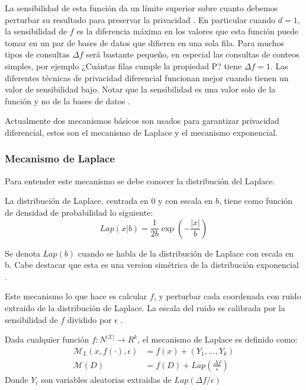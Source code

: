 La sensibilidad de esta función da un límite superior sobre cuanto debemos perturbar su resultado para preservar la privacidad \cite{dwork2014algorithmic}. En particular cuando $d = 1$, la sensibilidad de $f$ es la diferencia máxima en los valores que esta función puede tomar en un par de bases de datos que difieren en una sola fila. Para muchos tipos de consultas $\Delta f$ será bastante pequeño, en especial las consultas de conteos simples, por ejemplo ¿Cuántas filas cumple la propiedad P? tiene $\Delta f = 1$. Las diferentes técnicas de privacidad diferencial funcionan mejor cuando tienen un valor de sensibilidad bajo. Notar que la sensibilidad es una valor solo de la función y no de la bases de datos \cite{dwork2008differential}.

Actualmente dos mecanismos básicos son usados para garantizar privacidad diferencial, estos son el mecanismo de Laplace y el mecanismo exponencial.

\subsubsection{Mecanismo de Laplace}

Para entender este mecanismo se debe conocer la distribución del Laplace.

\begin{definicion}
  La distribución de Laplace, centrada en 0 y con escala en $b$, tiene como función de densidad de probabilidad lo siguiente:
  \begin{equation}
    Lap(x|b) = \frac{1}{2b} \exp\left(- \frac{|x|}{b}\right)
  \end{equation}
\end{definicion}

Se denota $Lap(b)$ cuando se habla de la distribución de Laplace con escala en b. Cabe destacar que esta es una version simétrica de la distribución exponencial \cite{dwork2014algorithmic}.

Este mecanismo lo que hace es calcular $f$, y perturbar cada coordenada con ruido extraido de la distribución de Laplace. La escala del ruido es calibrada por la sensibilidad de $f$ dividido por $\epsilon$ \cite{dwork2014algorithmic}.

\begin{definicion}
    Dada cualquier función $f : N^{|\mathcal{X}|} \to R^k$, el mecanismo de Laplace es definido como:
    \begin{equation}
      \begin{split}
        \mathcal{M}_L(x, f(·), \epsilon) & = f(x) + (Y_1, ..., Y_k) \\
        \mathcal{M}(D) & = f(D) + Lap\left( \frac{\Delta f}{\epsilon}\right)
       \end{split}
    \end{equation}
    Donde $Y_i$ son variables aleatorias extraidas de $Lap(\Delta f/\epsilon)$
\end{definicion}

